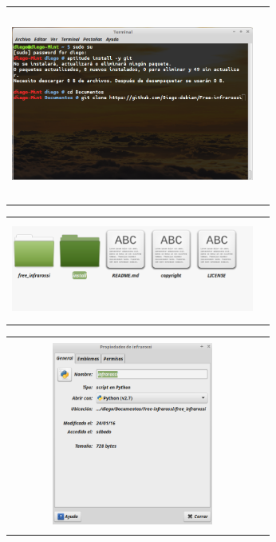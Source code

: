 \documentclass[12]{article}
\newenvironment{Figure}
{\par\medskip\noindent\minipage{\linewidth}}
{\endminipage\par\medskip}
\begin{document}
\begin{multicols}{2}
\begin{Figure}	
\center
\begin{tabular}{|l|r|}
\hline
\\
\includegraphics[width=8cm, height=6cm]{img/S_install2.png} \\\\ \hline
\end{tabular}
\label{fig:Comandos_terminal}
\end{Figure}
\begin{Figure}	
\center
\begin{tabular}{|l|r|}
\hline
\\
\includegraphics[width=8cm, height=3cm]{img/S_install.png} \\\\ \hline
\end{tabular}
\label{fig:Navegador_archivos}
\end{Figure}
\begin{Figure}	
\center
\begin{tabular}{|l|r|}
\hline
\\
\includegraphics[width=8cm, height=6cm]{img/S_propiedades1.png} \\\\ \hline

\end{tabular}
\end{Figure}
\end{multicols}
\end{document}
